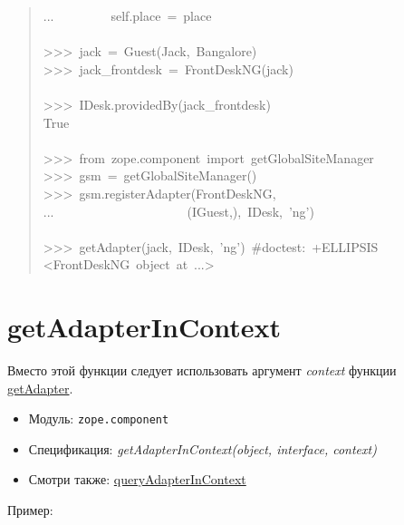 \documentclass[14pt,a4paper,openany,twoside,final]{extbook}
\providecommand*{\DUroletitlereference}[1]{\textsl{#1}}
\begin{document}
\begin{quote}
{...~~~~~~~~~self.place~=~place\\
~\\
>{}>{}>~jack~=~Guest(\textquotedbl{}Jack\textquotedbl{},~\textquotedbl{}Bangalore\textquotedbl{})\\
>{}>{}>~jack\_frontdesk~=~FrontDeskNG(jack)\\
~\\
>{}>{}>~IDesk.providedBy(jack\_frontdesk)\\
True\\
~\\
>{}>{}>~from~zope.component~import~getGlobalSiteManager\\
>{}>{}>~gsm~=~getGlobalSiteManager()\\
>{}>{}>~gsm.registerAdapter(FrontDeskNG,\\
...~~~~~~~~~~~~~~~~~~~~~(IGuest,),~IDesk,~'ng')\\
~\\
>{}>{}>~getAdapter(jack,~IDesk,~'ng')~\#doctest:~+ELLIPSIS\\
<FrontDeskNG~object~at~...>
}
\end{quote}


\section*{getAdapterInContext%
  \label{getadapterincontext}%
}

Вместо этой функции следует использовать аргумент \DUroletitlereference{context} функции \hyperref[getadapter]{getAdapter}.

\begin{itemize}

\item Модуль: \texttt{zope.component}

\item Спецификация: \DUroletitlereference{getAdapterInContext(object, interface, context)}

\item Смотри также: \hyperref[queryadapterincontext]{queryAdapterInContext}

\end{itemize}

Пример:
\end{document}
